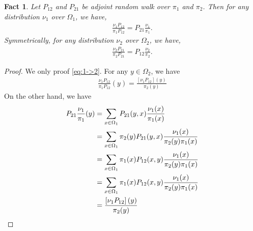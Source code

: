 \documentclass{article}
\newtheorem{fact}{Fact}
\begin{document}
\begin{fact}
  Let $P_{12}$ and $P_{21}$ be \emph{adjoint random walk} over $\pi_1$ and $\pi_2$.
  Then for any distribution $\nu_1$ over $\Omega_1$, we have,
  \begin{align} \label{eq:1->2}
    \frac{\nu_1 P_{12}}{\pi_1 P_{12}} = P_{21} \frac{\nu_1}{\pi_1}.
  \end{align}
  Symmetrically, for any distribution $\nu_2$ over $\Omega_2$, we have,
  \begin{align}
    \frac{\nu_2 P_{21}}{\pi_2 P_{21}} = P_{12} \frac{\nu_2}{\pi_2}.
  \end{align}
\end{fact}
\begin{proof}
  We only proof \eqref{eq:1->2}.
  For any $y \in \Omega_2$, we have
  \begin{align*}
    \frac{\nu_1 P_{12}}{\pi_1 P_{12}} (y) = \frac{\left[\nu_1P_{12}\right](y)}{\pi_2(y)}
  \end{align*}
  On the other hand, we have
  \begin{align*}
    P_{21}\frac{\nu_1}{\pi_1} (y)
    &= \sum_{x\in\Omega_1} P_{21}(y, x) \frac{\nu_1(x)}{\pi_1(x)} \\
    &= \sum_{x\in\Omega_1} \pi_2(y)P_{21}(y, x) \frac{\nu_1(x)}{\pi_2(y)\pi_1(x)} \\
    &= \sum_{x\in\Omega_1} \pi_1(x)P_{12}(x, y) \frac{\nu_1(x)}{\pi_2(y)\pi_1(x)} \\
    &= \sum_{x\in\Omega_1} \pi_1(x)P_{12}(x, y) \frac{\nu_1(x)}{\pi_2(y)\pi_1(x)} \\
    &= \frac{\left[\nu_1P_{12}\right](y)}{\pi_2(y)} \qedhere
  \end{align*}
\end{proof}
\end{document}
